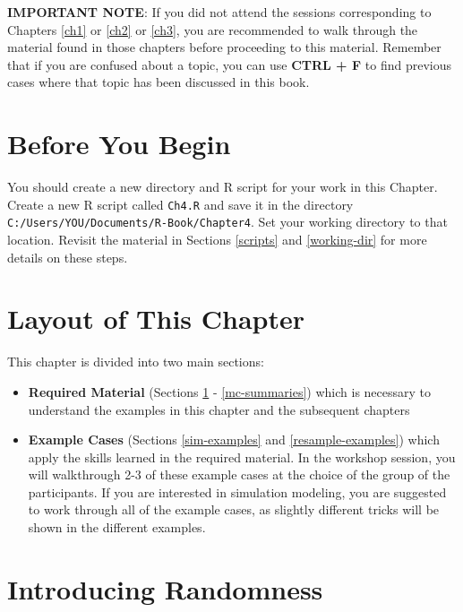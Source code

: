 \documentclass[]{book}
\begin{document}
\textbf{IMPORTANT NOTE}: If you did not attend the sessions corresponding to Chapters \ref{ch1} or \ref{ch2} or \ref{ch3}, you are recommended to walk through the material found in those chapters before proceeding to this material. Remember that if you are confused about a topic, you can use \textbf{CTRL + F} to find previous cases where that topic has been discussed in this book.

\hypertarget{before-you-begin-3}{%
\section*{Before You Begin}\label{before-you-begin-3}}

You should create a new directory and R script for your work in this Chapter. Create a new R script called \texttt{Ch4.R} and save it in the directory \texttt{C:/Users/YOU/Documents/R-Book/Chapter4}. Set your working directory to that location. Revisit the material in Sections \ref{scripts} and \ref{working-dir} for more details on these steps.

\hypertarget{layout-of-this-chapter}{%
\section*{Layout of This Chapter}\label{layout-of-this-chapter}}

This chapter is divided into two main sections:

\begin{itemize}
\item
  \textbf{Required Material} (Sections \ref{randomness} - \ref{mc-summaries}) which is necessary to understand the examples in this chapter and the subsequent chapters
\item
  \textbf{Example Cases} (Sections \ref{sim-examples} and \ref{resample-examples}) which apply the skills learned in the required material. In the workshop session, you will walkthrough 2-3 of these example cases at the choice of the group of the participants. If you are interested in simulation modeling, you are suggested to work through all of the example cases, as slightly different tricks will be shown in the different examples.
\end{itemize}

\hypertarget{randomness}{%
\section{Introducing Randomness}\label{randomness}}
\end{document}
